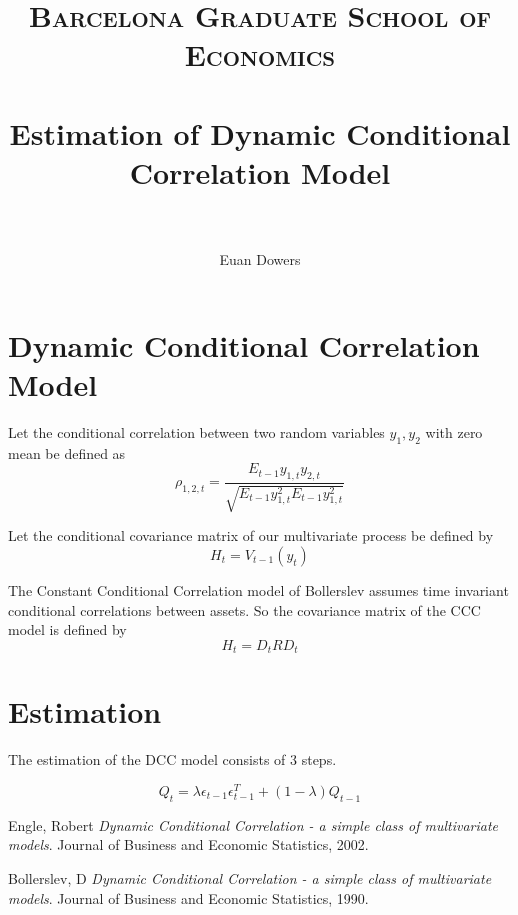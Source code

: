 \documentclass[paper=a4, fontsize=10pt]{scrartcl} %
\title{
\normalfont \normalsize
\textsc{Barcelona Graduate School of Economics} \\ [20pt] %
\horrule{0.5pt} \\[0.2cm] %
\Large Estimation of Dynamic Conditional Correlation Model \\ %
\horrule{0.5pt} \\[0.2cm] %
}
\author{Euan Dowers} %
\date{} %
\numberwithin{equation}{section} %
\numberwithin{figure}{section} %
\numberwithin{table}{section} %
\begin{document}
\maketitle %

\section{Dynamic Conditional Correlation Model}

Let the conditional correlation between two random variables $y_1, y_2$ with zero mean be defined as 
\begin{equation}
\rho_{1,2,t} = \frac{E_{t-1}y_{1,t}y_{2,t}}{\sqrt{E_{t-1}y_{1,t}^2E_{t-1}y_{1,t}^2}}
\end{equation}

Let the conditional covariance matrix of our multivariate process be defined by
\begin{equation}
H_t = V_{t-1}(y_t)
\end{equation}

The Constant Conditional Correlation model of Bollerslev \cite{bollerslev90} assumes time invariant conditional correlations between assets. So the covariance matrix of the CCC model is defined by
\begin{equation}
H_t = D_t R D_t 
\end{equation}

\section{Estimation}

The estimation of the DCC model consists of 3 steps. 

\begin{equation}
Q_t = \lambda\epsilon_{t-1}\epsilon_{t-1}^T + (1-\lambda) Q_{t-1}
\end{equation}

\begin{thebibliography}{9}
Engle, Robert
\textit{Dynamic Conditional Correlation - a simple class of multivariate models}. 
Journal of Business and Economic Statistics, 2002.

Bollerslev, D
\textit{Dynamic Conditional Correlation - a simple class of multivariate models}. 
Journal of Business and Economic Statistics, 1990.
\end{thebibliography}
\end{document}
